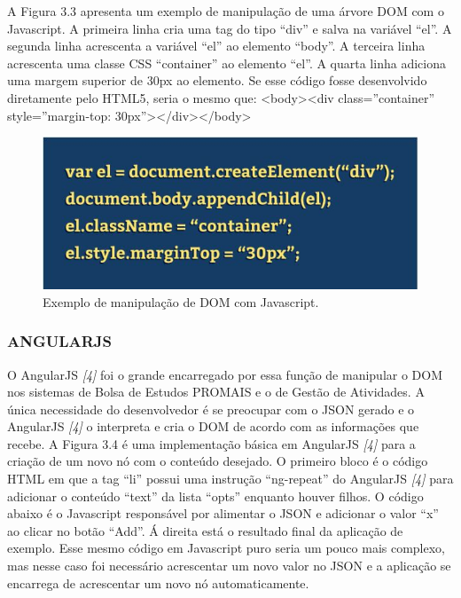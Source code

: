 \documentclass[
  12pt,				%
  openany,
  oneside,
  a4paper,			%
  english,			%
  brazil
]{article}
\numberwithin{figure}{section}
\numberwithin{table}{section}
\begin{document}
A Figura 3.3 apresenta um exemplo de manipulação de uma árvore DOM com o Javascript. A primeira linha cria uma tag do tipo “div” e salva na variável “el”. A segunda linha acrescenta a variável “el” ao elemento “body”. A terceira linha acrescenta uma classe CSS
“container” ao elemento “el”. A quarta linha adiciona uma margem superior de 30px ao elemento.
Se esse código fosse desenvolvido diretamente pelo HTML5, seria o mesmo que:
<body><div class=”container” style=”margin-top: 30px”></div></body>

\begin{figure}[!htb]
\centering
\includegraphics[width=1\textwidth]{figura33}
\caption{Exemplo de manipulação de DOM com Javascript.}
\end{figure}


\subsubsection{ANGULARJS}

O AngularJS \textit{[4]} foi o grande encarregado por essa função de manipular o DOM nos sistemas de Bolsa de Estudos PROMAIS e o de Gestão de Atividades. A única necessidade do desenvolvedor é se preocupar com o JSON gerado e o AngularJS \textit{[4]} o interpreta e cria o DOM de acordo com as informações que recebe.
A Figura 3.4 é uma implementação básica em AngularJS \textit{[4]} para a criação de um novo nó com o conteúdo desejado. O primeiro bloco é o código HTML em que a tag “li” possui uma instrução “ng-repeat” do AngularJS \textit{[4]} para adicionar o conteúdo “text” da lista “opts” enquanto houver filhos. O código abaixo é o Javascript responsável por alimentar o JSON e adicionar o valor “x” ao clicar no botão “Add”. Á direita está o resultado final da aplicação de exemplo.
Esse mesmo código em Javascript puro seria um pouco mais complexo, mas nesse caso foi necessário acrescentar um novo valor no JSON e a aplicação se encarrega de acrescentar um novo nó automaticamente.
\end{document}
